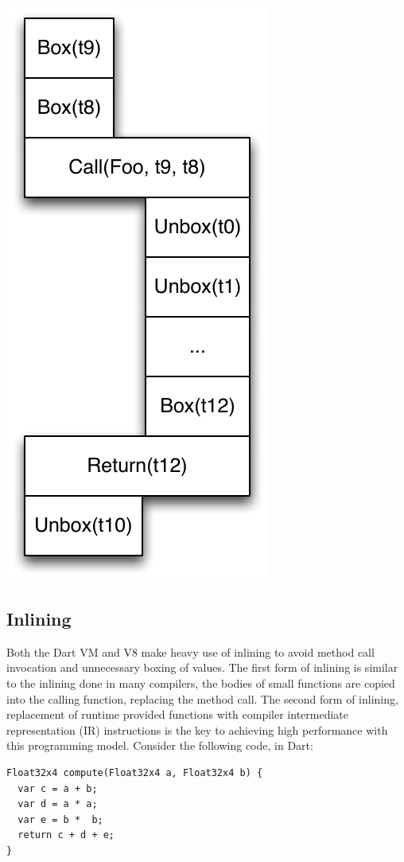 \documentclass[preprint]{sigplanconf}
\begin{document}
\includegraphics{figures/boxunboxbox-eps-converted-to.pdf}
\fi

\subsection{Inlining}
\label{inlining}
Both the Dart VM and V8 make heavy use of inlining to avoid method call invocation and unnecessary boxing of values. The first form of inlining is similar to the inlining done in many compilers, the bodies of small functions are copied into the calling function, replacing the method call. The second form of inlining, replacement of runtime provided functions with compiler intermediate representation (IR) instructions is the key to achieving high performance with this programming model. Consider the following code, in Dart:

\begin{verbatim}
Float32x4 compute(Float32x4 a, Float32x4 b) {
  var c = a + b;
  var d = a * a;
  var e = b *  b;
  return c + d + e;
}
\end{verbatim}
\end{document}
